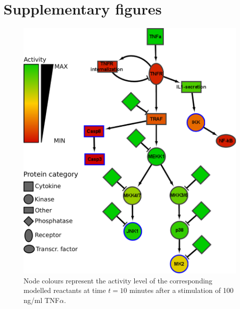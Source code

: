 \documentclass{bmcart}
\begin{document}
%
%
%
%





\clearpage

\section{Supplementary figures}\label{sec:supplementary-figures}


\begin{figure}[htpb]
\begin{minipage}{\textwidth}
\centering
  \includegraphics[width=.7\textwidth]{images/large_network_tnfa2}
\caption{ Node colours represent the activity level of the
corresponding modelled reactants at time $t = 10$ minutes after a stimulation of 100 ng/ml TNF$\alpha$.}\label{fig:large-model-tnf}
\end{minipage}
\end{figure}
\end{document}

